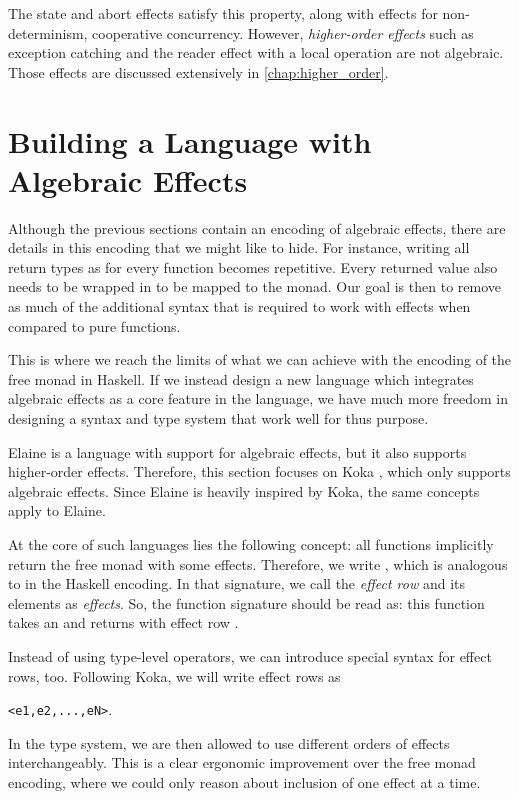 The state and abort effects satisfy this property, along with effects for non-determinism, cooperative concurrency. However, \emph{higher-order effects} such as exception catching and the reader effect with a local operation are not algebraic. Those effects are discussed extensively in \cref{chap:higher_order}.

\section{Building a Language with Algebraic Effects}

Although the previous sections contain an encoding of algebraic effects, there are details in this encoding that we might like to hide. For instance, writing all return types as  for every function becomes repetitive. Every returned value also needs to be wrapped in  to be mapped to the monad. Our goal is then to remove as much of the additional syntax that is required to work with effects when compared to pure functions.

This is where we reach the limits of what we can achieve with the encoding of the free monad in Haskell. If we instead design a new language which integrates algebraic effects as a core feature in the language, we have much more freedom in designing a syntax and type system that work well for thus purpose.

Elaine is a language with support for algebraic effects, but it also supports higher-order effects. Therefore, this section focuses on Koka \autocite{leijen_koka_2014,leijen_koka_2023}, which only supports algebraic effects. Since Elaine is heavily inspired by Koka, the same concepts apply to Elaine.

At the core of such languages lies the following concept: all functions implicitly return the free monad with some effects. Therefore, we write , which is analogous to  in the Haskell encoding. In that signature, we call  the \emph{effect row} and its elements as \emph{effects}. So, the function signature  should be read as: this function takes an  and returns  with effect row .

Instead of using type-level operators, we can introduce special syntax for effect rows, too. Following Koka, we will write effect rows as
\begin{center}\texttt{<e1,e2,...,eN>}.\end{center}
In the type system, we are then allowed to use different orders of effects interchangeably. This is a clear ergonomic improvement over the free monad encoding, where we could only reason about inclusion of one effect at a time. 

